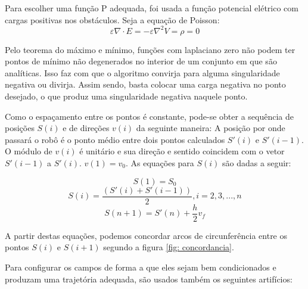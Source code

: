 \documentclass[a4paper,12pt]{article}
\begin{document}
Para escolher uma função P adequada, foi usada a função potencial elétrico com cargas positivas nos obstáculos. Seja a equação de Poisson:
\begin{equation}
\varepsilon \nabla \cdot E = -\varepsilon \nabla ^2 V=\rho = 0
\end{equation}

Pelo teorema do máximo e mínimo, funções com laplaciano zero não podem ter pontos de mínimo não degenerados no interior de um conjunto em que são analíticas. Isso faz com que o algoritmo convirja para alguma singularidade negativa ou divirja. Assim sendo, basta colocar uma carga negativa no ponto desejado, o que produz uma singularidade negativa naquele ponto.

Como o espaçamento entre os pontos é constante, pode-se obter a sequência de posições $S(i)$ e de direções $v(i)$ da seguinte maneira: A posição por onde passará o robô é o ponto médio entre dois pontos calculados $S'(i)$ e $S'(i-1)$. O módulo de $v(i)$ é unitário e sua direção e sentido coincidem com o vetor $S'(i-1)$ a $S'(i)$. $v(1) = v_{0}$. As equações para $S(i)$ são dadas a seguir:

\begin{equation}
	S(1) = S_{0}
\end{equation}
\begin{equation}
	S(i) = \frac{(S'(i)+S'(i-1))}{2}, i = 2,3,...,n
\end{equation}
\begin{equation}
	S(n+1) = S'(n) + \frac{h}{2} v_{f}
\end{equation}

A partir destas equações, podemos concordar arcos de circunferência entre os pontos $S(i)$ e $S(i+1)$ segundo a figura \ref{fig: concordancia}.

Para configurar os campos de forma a que eles sejam bem condicionados e produzam uma trajetória adequada, são usados também os seguintes artifícios:
\end{document}
